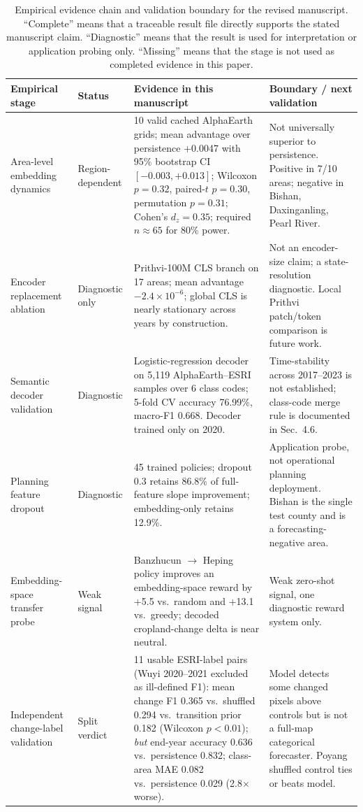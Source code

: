 \documentclass{article}
\begin{document}
\begin{table}[htbp]
\centering
\caption{Empirical evidence chain and validation boundary for the revised manuscript. ``Complete'' means that a traceable result file directly supports the stated manuscript claim. ``Diagnostic'' means that the result is used for interpretation or application probing only. ``Missing'' means that the stage is not used as completed evidence in this paper.}
\label{tab:empirical_pipeline}
\footnotesize
\setlength{\tabcolsep}{2pt}
\begin{tabular}{@{}P{0.20\textwidth}P{0.11\textwidth}P{0.37\textwidth}P{0.26\textwidth}@{}}
\toprule
Empirical stage & Status & Evidence in this manuscript & Boundary / next validation \\
\midrule
Area-level embedding dynamics & Region-dependent & 10 valid cached AlphaEarth grids; mean advantage over persistence +0.0047 with 95\% bootstrap CI $[-0.003, +0.013]$; Wilcoxon $p=0.32$, paired-$t$ $p=0.30$, permutation $p=0.31$; Cohen's $d_z=0.35$; required $n\approx 65$ for 80\% power. & Not universally superior to persistence. Positive in 7/10 areas; negative in Bishan, Daxinganling, Pearl River. \\
Encoder replacement ablation & Diagnostic only & Prithvi-100M CLS branch on 17 areas; mean advantage $-2.4\times 10^{-6}$; global CLS is nearly stationary across years by construction. & Not an encoder-size claim; a state-resolution diagnostic. Local Prithvi patch/token comparison is future work. \\
Semantic decoder validation & Diagnostic & Logistic-regression decoder on 5,119 AlphaEarth--ESRI samples over 6 class codes; 5-fold CV accuracy 76.99\%, macro-F1 0.668. Decoder trained only on 2020. & Time-stability across 2017--2023 is not established; class-code merge rule is documented in Sec.~4.6. \\
Planning feature dropout & Diagnostic & 45 trained policies; dropout 0.3 retains 86.8\% of full-feature slope improvement; embedding-only retains 12.9\%. & Application probe, not operational planning deployment. Bishan is the single test county and is a forecasting-negative area. \\
Embedding-space transfer probe & Weak signal & Banzhucun $\to$ Heping policy improves an embedding-space reward by +5.5 vs.\ random and +13.1 vs.\ greedy; decoded cropland-change delta is near neutral. & Weak zero-shot signal, one diagnostic reward system only. \\
Independent change-label validation & Split verdict & 11 usable ESRI-label pairs (Wuyi 2020--2021 excluded as ill-defined F1): mean change F1 0.365 vs.\ shuffled 0.294 vs.\ transition prior 0.182 (Wilcoxon $p<0.01$); \emph{but} end-year accuracy 0.636 vs.\ persistence 0.832; class-area MAE 0.082 vs.\ persistence 0.029 (2.8$\times$ worse). & Model detects some changed pixels above controls but is not a full-map categorical forecaster. Poyang shuffled control ties or beats model. \\

\end{tabular}
\end{table}
\end{document}
